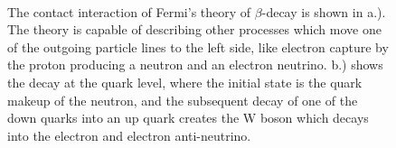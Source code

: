 \begin{figure}
  \centering
  \centering
  \\
  \caption{The contact interaction of Fermi's theory of $\beta$-decay is shown in a.). The theory is
    capable of describing other processes which move one of the outgoing particle lines
    to the left side, like electron capture by the proton producing a neutron and an
    electron neutrino. b.) shows the decay at the quark level, where the initial state is the
    quark makeup of the neutron, and the subsequent decay of one of the down quarks into an up
    quark creates the W boson which decays into the electron and electron anti-neutrino.}
  \label{fig:pointInteraction}
\end{figure}

